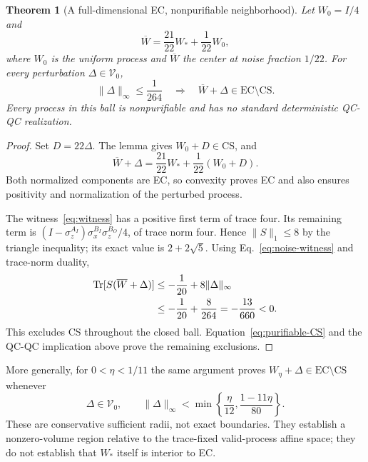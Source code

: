 \documentclass[11pt]{article}
\newcommand{\Tr}{\operatorname{Tr}}
\newcommand{\CS}{\mathrm{CS}}
\newcommand{\EC}{\mathrm{EC}}
\newtheorem{theorem}{Theorem}
\begin{document}
\begin{theorem}[A full-dimensional EC, nonpurifiable neighborhood]
Let $W_0=I/4$ and
\begin{equation}
 \overline W=\frac{21}{22}W_*+\frac1{22}W_0,
 \label{eq:robust-center}
\end{equation}
where $W_0$ is the uniform process and $\overline W$ the center at noise fraction $1/22$. For every perturbation $\Delta\in\mathcal V_0$,
\begin{equation}
 \|\Delta\|_\infty\le\frac1{264}
 \quad\Longrightarrow\quad
 \overline W+\Delta\in\EC\setminus\CS.
 \label{eq:robust-ball}
\end{equation}
Every process in this ball is nonpurifiable and has no standard deterministic QC-QC realization.
\end{theorem}
\begin{proof}
Set $D=22\Delta$. The lemma gives $W_0+D\in\CS$, and
\begin{equation}
 \overline W+\Delta
 =\frac{21}{22}W_*+\frac1{22}(W_0+D).
 \label{eq:robust-convexity}
\end{equation}
Both normalized components are EC, so convexity proves EC and also ensures positivity and normalization of the perturbed process.

The witness~\eqref{eq:witness} has a positive first term of trace four. Its remaining term is
$(I-\sigma_z^{A_I})\sigma_x^{B_I}\sigma_z^{B_O}/4$, of trace norm four. Hence $\|S\|_1\le8$ by the triangle inequality; its exact value is $2+2\sqrt5$. Using Eq.~\eqref{eq:noise-witness} and trace-norm duality,
\begin{align}
 \Tr[S(\overline W+\Delta)]
 &\le-\frac1{20}+8\|\Delta\|_\infty\notag\\
 &\le-\frac1{20}+\frac8{264}
 =-\frac{13}{660}<0.
 \label{eq:robust-witness}
\end{align}
This excludes CS throughout the closed ball. Equation~\eqref{eq:purifiable-CS} and the QC-QC implication above prove the remaining exclusions.
\end{proof}

More generally, for $0<\eta<1/11$ the same argument proves $W_\eta+\Delta\in\EC\setminus\CS$ whenever
\begin{equation}
 \Delta\in\mathcal V_0,\qquad
 \|\Delta\|_\infty<\min\left\{\frac\eta{12},\frac{1-11\eta}{80}\right\}.
 \label{eq:general-robust-radius}
\end{equation}
These are conservative sufficient radii, not exact boundaries. They establish a nonzero-volume region relative to the trace-fixed valid-process affine space; they do not establish that $W_*$ itself is interior to EC.
\end{document}
